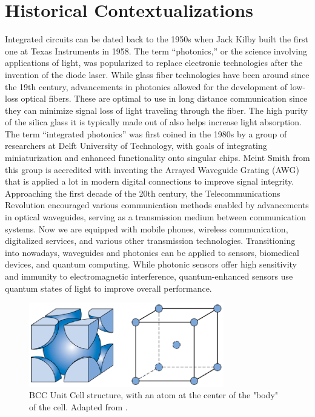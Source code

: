 \documentclass[10pt]{article}
\begin{document}
\section{Historical Contextualizations}

Integrated circuits can be dated back to the 1950s when Jack Kilby built the first one at Texas Instruments in 1958. The term “photonics,” or the science involving applications of light, was popularized to replace electronic technologies after the invention of the diode laser. While glass fiber technologies have been around since the 19th century, advancements in photonics allowed for the development of low-loss optical fibers. These are optimal to use in long distance communication since they can minimize signal loss of light traveling through the fiber. The high purity of the silica glass it is typically made out of also helps increase light absorption. The term “integrated photonics” was first coined in the 1980s by a group of researchers at Delft University of Technology, with goals of integrating miniaturization and enhanced functionality onto singular chips. Meint Smith from this group is accredited with inventing the Arrayed Waveguide Grating (AWG) that is applied a lot in modern digital connections to improve signal integrity. Approaching the first decade of the 20th century, the Telecommunications Revolution encouraged various communication methods enabled by advancements in optical waveguides, serving as a transmission medium between communication systems. Now we are equipped with mobile phones, wireless communication, digitalized services, and various other transmission technologies. Transitioning into nowadays, waveguides and photonics can be applied to sensors, biomedical devices, and quantum computing. While photonic sensors offer high sensitivity and immunity to electromagnetic interference, quantum-enhanced sensors use quantum states of light to improve overall performance.

\begin{figure}[h]
    \centering
    \includegraphics[width=8.5cm]{fig1.eps}
    \caption{\label{tab1}BCC Unit Cell structure, with an atom at the center of the "body" of the cell. Adapted from \cite{ref01}.} 
    \end{figure}
\end{document}
